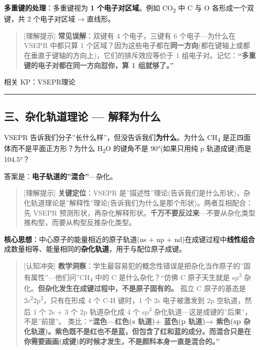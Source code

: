 \textbf{多重键的处理}：多重键视为 \textbf{1 个电子对区域}。例如 CO\textsubscript{2} 中 C 与 O 各形成一个双键，共 2 个电子对区域 → 直线形。

\begin{quote}
{[}理解提示{]} \textbf{常见误解}：双键有 4 个电子，三键有 6 个电子---为什么在 VSEPR 中都只算 1 个区域？因为这些电子都在\textbf{同一方向}(都在键轴上或都在垂直于键轴的方向上)，它们的排斥效应等价于 1 组电子对。记忆：\textbf{``多重键的电子对都在同一方向怼你，算 1 组就够了。''}
\end{quote}

相关 KP：VSEPR理论

\begin{center}\rule{0.5\linewidth}{0.5pt}\end{center}

\subsection{三、杂化轨道理论 --- 解释为什么}\label{ux4e09ux6742ux5316ux8f68ux9053ux7406ux8bba-ux89e3ux91caux4e3aux4ec0ux4e48}

VSEPR 告诉我们分子''长什么样''，但没告诉我们\textbf{为什么}。为什么 CH\textsubscript{4} 是正四面体而不是平面正方形？为什么 H\textsubscript{2}O 的键角不是 90°(如果只用纯 p 轨道成键)而是 104.5°？

答案是：\textbf{电子轨道的''混合''}---杂化。

\begin{quote}
{[}理解提示{]} \textbf{关键定位}：VSEPR 是''描述性''理论(告诉我们是什么形状)，杂化轨道理论是''解释性''理论(告诉我们为什么是那个形状)。两者互相配合：先 VSEPR 预测形状，再杂化解释形状。\textbf{千万不要反过来}---不要从杂化类型推构型，而要从构型反推杂化类型。
\end{quote}

\textbf{核心思想}：中心原子的能量相近的原子轨道(ns + np + nd)在成键过程中\textbf{线性组合}成数量相等、能量相同的\textbf{杂化轨道}，用于与配位原子成键。

\begin{quote}
{[}认知冲突{]} \textbf{教学洞察}：学生最容易犯的概念性错误是把杂化当作原子的''固有属性''---他们问''CH\textsubscript{4} 中的 C 是什么杂化？``仿佛 C 原子天生就是 sp\textsuperscript{3} 杂化。\textbf{但杂化发生在成键过程中，不是原子固有的。} 孤立 C 原子的基态是 2s\textsuperscript{2}2p\textsuperscript{2}，只有在形成 4 个 C-H 键时，1 个 2s 电子被激发到 2p 空轨道，然后 1 个 2s + 3 个 2p 轨道杂化成 4 个 sp\textsuperscript{3} 杂化轨道---这是成键的''后果''，不是''前提''。
类比：\textbf{``混色---红色(s 轨道)+ 蓝色(p 轨道)→ 紫色(sp 杂化轨道)。紫色既不是红也不是蓝，但包含了红和蓝的成分。而混合只是在你需要画画(成键)的时候才发生，不是颜料本身一直是混合的。''}
\end{quote}

